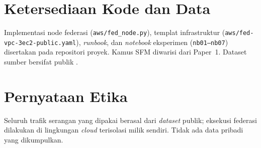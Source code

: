 \documentclass[11pt,a4paper]{article}
\begin{document}
\section*{Ketersediaan Kode dan Data}
Implementasi node federasi (\texttt{aws/fed\_node.py}), templat infrastruktur
(\texttt{aws/fed-vpc-3ec2-public.yaml}), \emph{runbook}, dan \emph{notebook}
eksperimen (\texttt{nb01--nb07}) disertakan pada repositori proyek. Kamus SFM
diwarisi dari Paper~1. Dataset sumber bersifat publik \cite{cicids,unsw}.

\section*{Pernyataan Etika}
Seluruh trafik serangan yang dipakai berasal dari \emph{dataset} publik; eksekusi
federasi dilakukan di lingkungan \emph{cloud} terisolasi milik sendiri. Tidak ada
data pribadi yang dikumpulkan.
\end{document}
